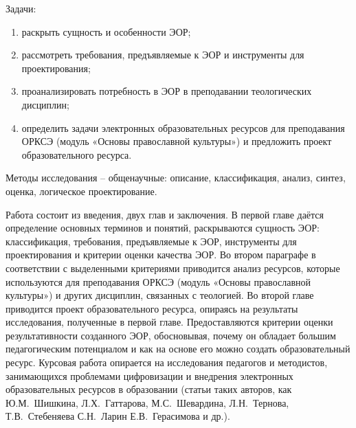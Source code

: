 Задачи:
\begin{enumerate}
\item\label{task1} раскрыть сущность и особенности ЭОР;
\item\label{task2}  рассмотреть требования, предъявляемые к ЭОР и инструменты для проектирования; 
\item\label{task3}  проанализировать потребность в ЭОР в преподавании теологических дисциплин;
\item\label{task4}  определить задачи электронных образовательных ресурсов для преподавания ОРКСЭ (модуль «Основы православной культуры») и предложить проект образовательного ресурса.

\end{enumerate}


Методы исследования – общенаучные: описание, классификация, анализ, синтез, оценка, логическое проектирование.

Работа состоит из введения, двух глав и заключения. В первой главе даётся определение основных терминов и понятий, раскрываются сущность ЭОР: классификация, требования, предъявляемые к ЭОР, инструменты для проектирования и критерии оценки качества ЭОР.
Во втором параграфе в соответствии с выделенными критериями приводится анализ ресурсов, которые используются для преподавания ОРКСЭ (модуль «Основы православной культуры») и других дисциплин, связанных с теологией. Во второй главе приводится проект образовательного ресурса, опираясь на результаты исследования, полученные в первой главе.
Предоставляются критерии оценки результативности созданного ЭОР, обосновывая, почему он обладает большим педагогическим потенциалом и как на основе его можно создать образовательный ресурс.
Курсовая работа опирается на исследования педагогов и методистов, занимающихся проблемами цифровизации и внедрения электронных образовательных ресурсов в образовании (статьи таких авторов, как Ю.М.~Шишкина, Л.Х.~Гаттарова, М.С.~Шевардина, Л.Н.~Тернова, Т.В.~Стебеняева С.Н.~Ларин Е.В.~Герасимова и др.).
